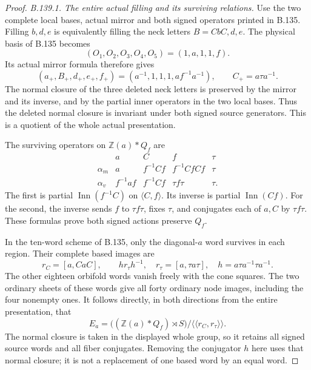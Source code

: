 \begin{proof}
\emph{B.139.1. The entire actual filling and its surviving relations.}
Use the two complete local bases, actual mirror and both signed
operators printed in B.135. Filling $b,d,e$ is equivalently filling
the neck letters $B=CbC,d,e$. The physical basis of B.135 becomes
\[
 (O_1,O_2,O_3,O_4,O_5)=(1,a,1,1,f).
\]
Its actual mirror formula therefore gives
\[
 (a_+,B_+,d_+,e_+,f_+)=(a^{-1},1,1,1,af^{-1}a^{-1}),
 \qquad C_+=a\tau a^{-1}.
\]
The normal closure of the three deleted neck letters is preserved
by the mirror and its inverse, and by the partial inner operators
in the two local bases. Thus the deleted normal closure is invariant
under both signed source generators. This is a quotient of the
whole actual presentation.

The surviving operators on $\mathbb Z(a)*Q_f$ are
\begin{equation}\label{eq:B139-operators}
 \begin{array}{c|cccc}
       &a&C&f&\tau\\ \hline
 \alpha_m&a&f^{-1}Cf&f^{-1}CfCf&\tau\\
 \alpha_v&f^{-1}af&f^{-1}Cf&\tau f\tau&\tau .
 \end{array}
\end{equation}
The first is partial $\operatorname{Inn}(f^{-1}C)$ on $\langle C,f\rangle$.
Its inverse is partial $\operatorname{Inn}(Cf)$.
For the second, the inverse sends $f$ to $\tau f\tau$, fixes $\tau$,
and conjugates each of $a,C$ by $\tau f\tau$.
These formulas prove both signed actions preserve $Q_f$.

In the ten-word scheme of B.135, only the diagonal-$a$ word
survives in each region. Their complete based images are
\begin{equation}\label{eq:B139-surviving-nodes}
 r_C=[a,CaC],\qquad
 h r_\tau h^{-1},\quad
 r_\tau=[a,\tau a\tau],\quad
 h=a\tau a^{-1}\tau a^{-1}.
\end{equation}
The other eighteen orbifold words vanish freely with the cone squares.
The two ordinary sheets of these words give all forty ordinary
node images, including the four nonempty ones.
It follows directly, in both directions from the entire presentation,
that
\begin{equation}\label{eq:B139-two-normal-generators}
 E_a=
 \bigl((\mathbb Z(a)*Q_f)\rtimes S\bigr)/
       \langle\!\langle r_C,r_\tau\rangle\!\rangle .
\end{equation}
The normal closure is taken in the displayed whole group, so it
retains all signed source words and all fiber conjugates.
Removing the conjugator $h$ here uses that normal closure; it is
not a replacement of one based word by an equal word.


\end{proof}
